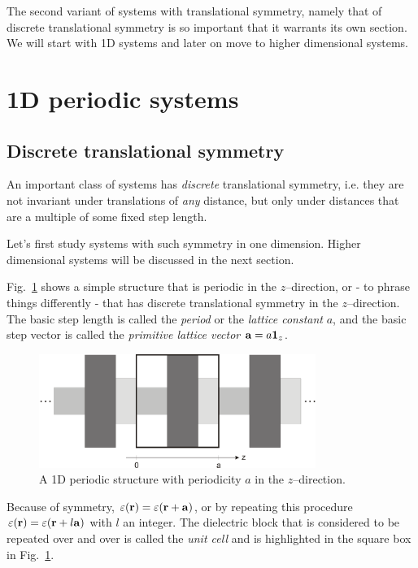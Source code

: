 The second variant of systems with translational symmetry, namely that of discrete translational symmetry is so important that it warrants its own section. We will start with 1D systems and later on move to higher dimensional systems.

\section{1D periodic systems}

\subsection{Discrete translational symmetry}

An important class of systems has \emph{discrete} translational symmetry, i.e. they are not invariant under translations of \emph{any} distance, but only under distances that are a multiple of some fixed step length.

Let's first study systems with such symmetry in one dimension. Higher dimensional systems will be discussed in the next section.

Fig.~\ref{fig-1d-periodic} shows a simple structure that is periodic in the $z$--direction, or - to phrase things differently - that has discrete translational symmetry in the $z$--direction. The basic step length is called the \emph{period} or the \emph{lattice constant} $a$, and the basic step vector is called the \emph{primitive lattice vector} ${\bf a} = a {\bf 1}_z$.

\begin{figure}[htb]
\centering
\includegraphics[width=9cm]{periodic/figures/periodic}
\caption{A 1D periodic structure with periodicity $a$ in the $z$--direction.}
\label{fig-1d-periodic}
\end{figure}

Because of symmetry, $\varepsilon({\bf r}) =  \varepsilon({\bf r} + {\bf a})$, or by repeating this procedure $\varepsilon({\bf r}) =  \varepsilon({\bf r} + l {\bf a})$ with $l$ an integer. The dielectric block that is considered to be repeated over and over is called the \emph{unit cell} and is highlighted in the square box in Fig.~\ref{fig-1d-periodic}. 

